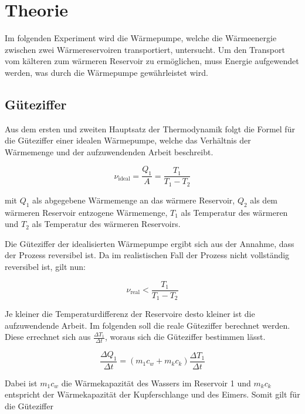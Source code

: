 \section{Theorie}
\label{sec:Theorie}

Im folgenden Experiment wird die Wärmepumpe, welche die Wärmeenergie zwischen zwei Wärmereservoiren transportiert, untersucht. Um den Transport vom kälteren zum wärmeren Reservoir zu ermöglichen, muss Energie aufgewendet werden, was durch die Wärmepumpe gewährleistet wird.

\subsection{Güteziffer}
Aus dem ersten und zweiten Hauptsatz der Thermodynamik folgt die Formel für die Güteziffer einer idealen Wärmepumpe, welche das Verhältnis der Wärmemenge und der aufzuwendenden Arbeit beschreibt.

\begin{equation}
ν_{\mathrm{ideal}} = \frac{Q_{1}}{A} = \frac{T_{1}}{T_{1}-T_{2}}
\end{equation}

mit $Q_{1}$ als abgegebene Wärmemenge an das wärmere Reservoir, $Q_{2}$ als dem wärmeren Reservoir entzogene Wärmemenge, $T_{1}$ als Temperatur des wärmeren und $T_{2}$ als Temperatur des wärmeren Reservoirs.

Die Güteziffer der idealisierten Wärmepumpe ergibt sich aus der Annahme, dass der Prozess reversibel ist. Da im realistischen Fall der Prozess nicht vollständig reversibel ist, gilt nun:

\begin{equation}
ν_{\mathrm{real}} < \frac{T_{1}}{T_{1} - T_{2}}
\end{equation}

Je kleiner die Temperaturdifferenz der Reservoire desto kleiner ist die aufzuwendende Arbeit.
Im folgenden soll die reale Güteziffer berechnet werden. Diese errechnet sich aus $\frac{\Delta T_{1}}{\Delta t}$, woraus sich die Güteziffer bestimmen lässt.

\begin{equation}
\frac{\Delta Q_{1}}{\Delta t} = (m_{1} c_w + m_k c_k)\frac {\Delta T_{1}}{\Delta t}
\end{equation}

Dabei ist $m_{1} c_w$ die Wärmekapazität des Wassers im Reservoir 1 und $m_k c_k$ entspricht der Wärmekapazität der Kupferschlange und des Eimers. Somit gilt für die Güteziffer

